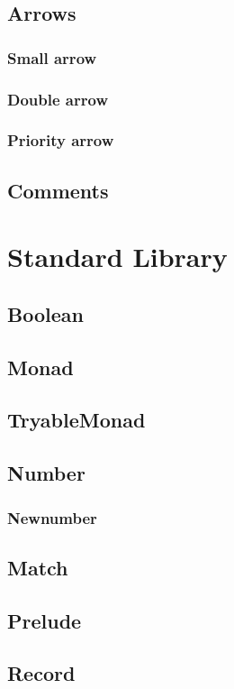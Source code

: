 \subsection{Arrows}
\subsubsection{Small arrow}
\subsubsection{Double arrow}
\subsubsection{Priority arrow}
\subsection{Comments}

\section{Standard Library}
\subsection{Boolean}
\subsection{Monad}
\subsection{TryableMonad}
\subsection{Number}
\subsubsection{Newnumber}
\subsection{Match}
\subsection{Prelude}
\subsection{Record}

